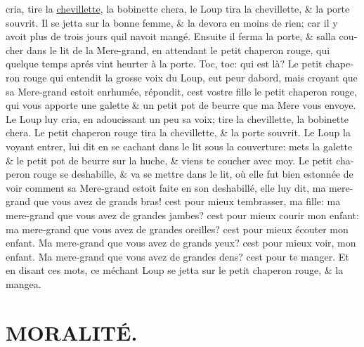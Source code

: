 \documentclass[14pt,a4paper]{memoir}
\newcommand{\ul}[1]{\uline{#1}}
\begin{document}
\begin{otherlanguage}{french}
cria, tire la \ul{chevillette}, la bobinette chera, le Loup tira la
chevillette, \& la porte s\textquotesingle ouvrit. Il se jetta sur la
bonne femme, \& la devora en moins de rien; car il y avoit plus de trois
jours qu\textquotesingle il n\textquotesingle avoit mangé. Ensuite il
ferma la porte, \& s\textquotesingle alla coucher dans le lit de la
Mere-grand, en attendant le petit chaperon rouge, qui quelque temps
aprés vint heurter à la porte. Toc, toc: qui est là? Le petit chaperon
rouge qui entendit la grosse voix du Loup, eut peur
d\textquotesingle abord, mais croyant que sa Mere-grand estoit enrhumée,
répondit, c\textquotesingle est vostre fille le petit chaperon rouge,
qui vous apporte une galette \& un petit pot de beurre que ma Mere vous
envoye. Le Loup luy cria, en adoucissant un peu sa voix; tire la
chevillette, la bobinette chera. Le petit chaperon rouge tira la
chevillette, \& la porte s\textquotesingle ouvrit. Le Loup la voyant
entrer, lui dit en se cachant dans le lit sous la couverture: mets la
galette \& le petit pot de beurre sur la huche, \& viens te coucher avec
moy. Le petit chaperon rouge se deshabille, \& va se mettre dans le lit,
où elle fut bien estonnée de voir comment sa Mere-grand estoit faite en
son deshabillé, elle luy dit, ma mere-grand que vous avez de grands
bras! c\textquotesingle est pour mieux t\textquotesingle embrasser, ma
fille: ma mere-grand que vous avez de grandes jambes?
c\textquotesingle est pour mieux courir mon enfant: ma mere-grand que
vous avez de grandes oreilles? c\textquotesingle est pour mieux écouter
mon enfant. Ma mere-grand que vous avez de grands yeux?
c\textquotesingle est pour mieux voir, mon enfant. Ma mere-grand que
vous avez de grandes dens? c\textquotesingle est pour te manger. Et en
disant ces mots, ce méchant Loup se jetta sur le petit chaperon rouge,
\& la mangea. \\

\section{MORALITÉ.}


\end{otherlanguage}
\end{document}
